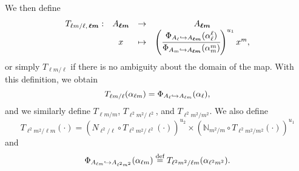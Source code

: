 \documentclass[a4paper,11pt]{article}
\begin{document}
We then define
\[
\begin{array}{cccc}
  T_{\ell m/\ell,\, \bm{\ell m}}: & A_{\bm{\ell m}} & \to & A_{\bm{\ell m}} \\
  & x & \mapsto & \left( \cfrac{\Phi_{A_{\ell}\hookrightarrow A_{\bm{\ell
  m}}}(\alpha_{\ell}^{\ell})}{\Phi_{A_{m}\hookrightarrow A_{\bm{\ell
  m}}}(\alpha_{m}^{m})}\right)^{u_1} x^{m},
\end{array}
\]
or simply $T_{\ell m/\ell}$ if there is no ambiguity about the domain of the
map. With this definition, we obtain
\[
  T_{\ell m/\ell}(\alpha_{\ell m}) = \Phi_{A_{\ell}\hookrightarrow A_{\ell
  m}}(\alpha_{\ell}),
\]
and we similarly define $T_{\ell m/m}$, $T_{\ell^2m^2/\ell^2}$, and
$T_{\ell^2m^2/m^2}$. We also define 
\[
  T_{\ell^2m^2/\ell m}(\cdot) = \left(N_{\ell^2/\ell}\circ
  T_{\ell^2m^2/\ell^2}(\cdot)\right)^{u_2}\times \left(\mathbb{N}_{m^2/m}\circ
  T_{\ell^2m^2/m^2}(\cdot)\right)^{u_1}
\]
and 
\[
  \Phi_{A_{\ell m}\hookrightarrow A_{\ell^2 m^2}}(\alpha_{\ell m})\overset{\text{def}}{=} T_{\ell^2m^2/\ell
  m}(\alpha_{\ell^2m^2}).
\]
\end{document}
